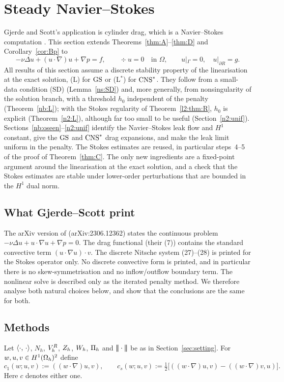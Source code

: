 \section{Steady Navier--Stokes}\label{ns:sec}

Gjerde and Scott's application is cylinder drag, which is a Navier--Stokes computation \cite{GjerdeScott2024}. This section extends Theorems~\ref{thm:A}--\ref{thm:D} and Corollary~\ref{cor:Bp} to
\[
-\nu\Delta u+(u\cdot\nabla)u+\nabla p=f,\qquad \div u=0\quad\text{in }\Omega,\qquad u|_\Gamma=0,\quad u|_{\partial R}=g .
\]
All results of this section assume a discrete stability property of the linearisation at the exact solution, (L) for $\mathrm{GS}$ or (L$^\ast$) for $\mathrm{CNS}^\ast$. They follow from a small-data condition (SD) (Lemma~\ref{ns:SD}) and, more generally, from nonsingularity of the solution branch, with a threshold $h_0$ independent of the penalty (Theorem~\ref{nb:L}); with the Stokes regularity of Theorem~\ref{l2:thm:R}, $h_0$ is explicit (Theorem~\ref{n2:L}), although far too small to be useful (Section~\ref{n2:unif}). Sections~\ref{nb:oseen}--\ref{n2:unif} identify the Navier--Stokes leak flow and $H^1$ constant, give the $\mathrm{GS}$ and $\mathrm{CNS}^\ast$ drag expansions, and make the leak limit uniform in the penalty. The Stokes estimates are reused, in particular steps~4--5 of the proof of Theorem~\ref{thm:C}. The only new ingredients are a fixed-point argument around the linearisation at the exact solution, and a check that the Stokes estimates are stable under lower-order perturbations that are bounded in the $H^1$ dual norm.

\subsection{What Gjerde--Scott print}\label{ns:gsprint}
The arXiv version of \cite{GjerdeScott2024} (arXiv:2306.12362) states the continuous problem $-\nu\Delta u+u\cdot\nabla u+\nabla p=0$. The drag functional (their (7)) contains the standard convective term $(u\cdot\nabla u)\cdot v$. The discrete Nitsche system (27)--(28) is printed for the Stokes operator only. No discrete convective form is printed, and in particular there is no skew-symmetrisation and no inflow/outflow boundary term. The nonlinear solve is described only as the iterated penalty method. We therefore analyse both natural choices below, and show that the conclusions are the same for both.

\subsection{Methods}
Let $\langle \cdot,\, \cdot\rangle$, $N_h$, $V_h^R$, $Z_h$, $W_h$, $\Pi_h$ and $|\!|\!|\cdot|\!|\!|$ be as in Section~\ref{sec:setting}. For $w,u,v\in H^1(\Omega_h)^2$ define
\[
c_1(w;u,v):=((w\cdot\nabla)u,v),\qquad
c_s(w;u,v):=\tfrac12\bigl[((w\cdot\nabla)u,v)-((w\cdot\nabla)v,u)\bigr].
\]
Here $c$ denotes either one.

